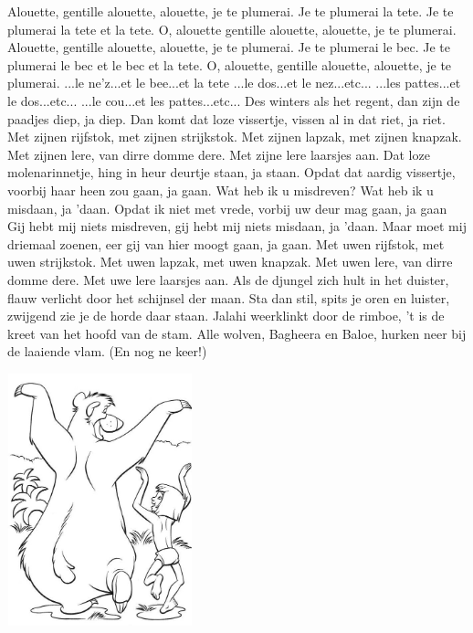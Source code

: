 \documentclass{article}
\begin{document}
\begin{songs}{}
\beginverse
Alouette, gentille alouette, alouette, je te plumerai.
Je te plumerai la tete. 
Je te plumerai la tete et la tete.
O, alouette gentille alouette, alouette, je te plumerai.
\endverse
\beginverse
Alouette, gentille alouette, alouette, je te plumerai.
Je te plumerai le bec.
Je te plumerai le bec et le bec et la tete.
O, alouette, gentille alouette, alouette, je te plumerai.
\endverse
\beginverse
...le ne'z...et le bee...et la tete
\endverse
\beginverse
...le dos...et le nez...etc...
\endverse
\beginverse
...les pattes...et le dos...etc...
\endverse
\beginverse
 ...le cou...et les pattes...etc...
\endverse
\endsong
{}
\beginverse
Des winters als het regent, dan zijn de paadjes diep, ja diep.
Dan komt dat loze vissertje, vissen al in dat riet, ja riet.
\endverse
\beginchorus
Met zijnen rijfstok, met zijnen strijkstok.
Met zijnen lapzak, met zijnen knapzak.
Met zijnen lere, van dirre domme dere.
Met zijne lere laarsjes aan. 
\endchorus
\beginverse
Dat loze molenarinnetje, hing in heur deurtje staan, ja staan.
Opdat dat aardig vissertje, voorbij haar heen zou gaan, ja gaan.
\endverse
\beginverse
Wat heb ik u misdreven? Wat heb ik u misdaan, ja 'daan.
Opdat ik niet met vrede, vorbij uw deur mag gaan, ja gaan
\endverse
\beginverse
Gij hebt mij niets misdreven, gij hebt mij niets misdaan, ja 'daan.
Maar moet mij driemaal zoenen, eer gij van hier moogt gaan, ja gaan.
\endverse
\beginchorus
Met uwen rijfstok, met uwen strijkstok.
Met uwen lapzak, met uwen knapzak.
Met uwen lere, van dirre domme dere.
Met uwe lere laarsjes aan. 
\endchorus
\endsong
{}
\beginverse*
Als de djungel zich hult in het duister, flauw verlicht door het schijnsel der maan.
Sta dan stil, spits je oren en luister, zwijgend zie je de horde daar staan. 
\endverse
\beginchorus
Jalahi weerklinkt door de rimboe, 't is de kreet van het hoofd van de stam.
Alle wolven, Bagheera en Baloe, hurken neer bij de laaiende vlam. 
(En nog ne keer!)
\endchorus
\endsong
\begin{intersong}
    \includegraphics[width=0.4\textwidth]{img3}

\end{intersong}
\end{songs}
\end{document}
